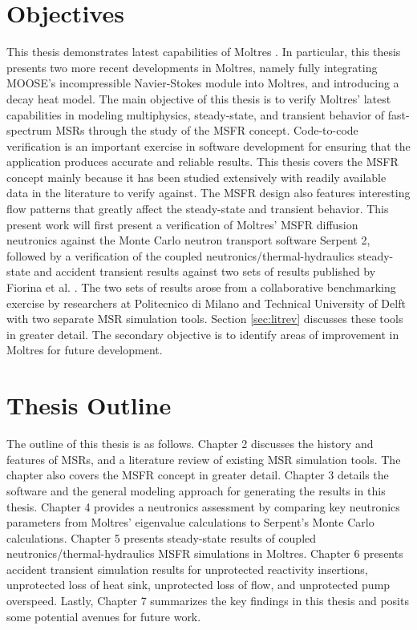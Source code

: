 \section{Objectives}

This thesis demonstrates latest capabilities of Moltres
\cite{lindsay_introduction_2018}.
In particular, this thesis presents two more recent
developments in Moltres, namely fully integrating \gls{MOOSE}'s incompressible
Navier-Stokes module into Moltres, and introducing a
decay heat model.
The main objective of this thesis is to verify Moltres'
latest capabilities in modeling multiphysics, steady-state, and transient
behavior of fast-spectrum \glspl{MSR} through the study of the \gls{MSFR}
concept. Code-to-code verification is an important exercise in software
development for ensuring that the application produces accurate and reliable
results. This thesis covers the \gls{MSFR} concept mainly because it has been
studied extensively with readily available data in the literature to verify
against. The \gls{MSFR} design also features interesting flow
patterns that greatly affect the steady-state and transient behavior. This
present work will first present a verification of Moltres' \gls{MSFR}
diffusion neutronics against the Monte Carlo neutron transport software
Serpent 2, followed by a verification of
the coupled neutronics/thermal-hydraulics steady-state and accident transient
results against two sets of results published by
Fiorina et al. \cite{fiorina_modelling_2014}. The two sets of results arose
from a collaborative benchmarking exercise by researchers at Politecnico di
Milano and Technical University of Delft with two separate \gls{MSR}
simulation tools. Section \ref{sec:litrev} discusses these tools
in greater detail. The
secondary objective is to identify areas of improvement in Moltres for future
development.

\section{Thesis Outline}

The outline of this thesis is as follows. Chapter 2 discusses the history and
features of \glspl{MSR}, and a literature review of existing \gls{MSR}
simulation tools. The chapter also covers the \gls{MSFR} concept in greater
detail. Chapter 3 details the software and the general modeling
approach for generating the results in this thesis. Chapter 4 provides a
neutronics assessment by comparing key neutronics parameters from Moltres'
eigenvalue calculations to Serpent's Monte Carlo calculations. Chapter 5
presents steady-state results of coupled neutronics/thermal-hydraulics
\gls{MSFR} simulations in Moltres. Chapter 6 presents accident transient
simulation results for unprotected reactivity insertions, unprotected loss of
heat sink, unprotected loss of flow, and unprotected pump overspeed. Lastly,
Chapter 7 summarizes the key findings in this thesis
and posits some potential avenues for future work.
